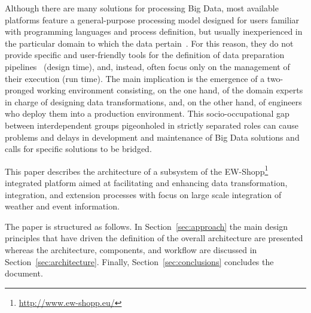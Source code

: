Although there are many solutions for processing Big Data, most available platforms feature a general-purpose processing model designed for users familiar with programming languages and process definition, but usually inexperienced in the particular domain to which the data pertain~\cite{sukhobok2016tabular}. For this reason, they do not provide specific and user-friendly tools for the definition of data preparation pipelines~\cite{rahm2000data} (design time), and, instead, often focus only on the management of their execution (run time). The main implication is the emergence of a two-pronged working environment consisting, on the one hand, of the domain experts in charge of designing data transformations, and, on the other hand, of engineers who deploy them into a production environment. This socio-occupational gap between interdependent groups pigeonholed in strictly separated roles can cause problems and delays in development and maintenance of Big Data solutions and calls for specific solutions to be bridged.  

This paper describes the architecture of a subsystem of the EW-Shopp\footnote{\url{http://www.ew-shopp.eu/}} integrated platform aimed at facilitating and enhancing data transformation, integration, and extension processes with focus on large scale integration of weather and event information.

The paper is structured as follows. 
In Section~\ref{sec:approach} the main design principles that have driven the definition of the overall architecture are presented whereas the architecture, components, and workflow are discussed in Section~\ref{sec:architecture}. %
Finally, Section~\ref{sec:conclusions} concludes the document. 








